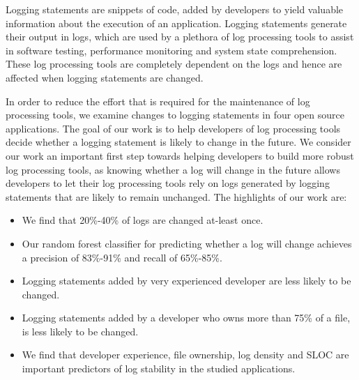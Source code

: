 Logging statements are snippets of code, added by developers to yield valuable information about the execution of an application. Logging statements generate their output in logs, which are used by a plethora of log processing tools to assist in software testing, performance monitoring and system state comprehension. These log processing tools are completely dependent on the logs and hence are affected when logging statements are changed.

In order to reduce the effort that is required for the maintenance of log processing tools, we examine changes to logging statements in four open source applications. The goal of our work is to help developers of log processing tools decide whether a logging statement is likely to change in the future. We consider our work an important first step towards helping developers to build more robust log processing tools, as knowing whether a log will change in the future allows developers to let their log processing tools rely on logs generated by logging statements that are likely to remain unchanged. The highlights of our work are:


\begin{itemize}
	\item We find that 20\%-40\% of logs are changed at-least once.
	\item Our random forest classifier for predicting whether a log will change achieves a precision of 83\%-91\% and recall of 65\%-85\%. 
	\item Logging statements added by very experienced developer are less likely to be changed.
	\item Logging statements added by a developer who owns more than 75\% of a file, is less likely to be changed. 
	\item We find that developer experience, file ownership, log density and SLOC are important predictors of log stability in the studied applications.  	
	
\end{itemize}

